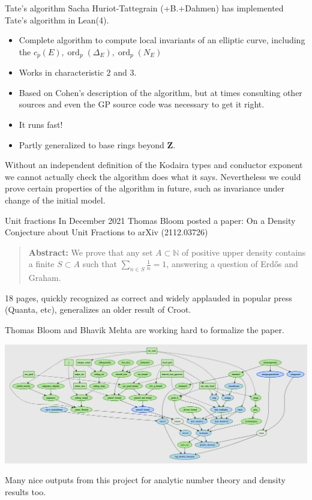 \documentclass{beamer}
\theoremstyle{plain}
\newcommand{\ZZ}{\mathbf{Z}}
\DeclareMathOperator{\ord}{ord}
\begin{document}
\begin{frame}{Tate's algorithm}
    Sacha Huriot-Tattegrain (+B.+Dahmen) has implemented Tate's algorithm in Lean(4).

    \begin{itemize}
        \item Complete algorithm to compute local invariants of an elliptic curve, including the $c_p(E), \ord_p(\Delta_E), \ord_p(N_E)$

        \item Works in characteristic 2 and 3.

        \item Based on Cohen's description of the algorithm, but at times consulting other sources and even the GP source code was necessary to get it right.

        \item It runs fast!

        \item Partly generalized to base rings beyond $\ZZ$.
    \end{itemize}

    Without an independent definition of the Kodaira types and conductor exponent we cannot actually check the algorithm does what it says.
    Nevertheless we could prove certain properties of the algorithm in future, such as invariance under change of the initial model.
\end{frame}


\begin{frame}{Unit fractions}
    In December 2021 Thomas Bloom posted a paper: On a Density Conjecture about Unit Fractions to arXiv (2112.03726)
    \begin{quote}
        \textbf{Abstract:} We prove that any set $A \subset \mathbb{N}$ of positive upper density contains a finite $S \subset A$ such that $\sum_{n \in S} \frac{1}{n}=1$, answering a question of Erdős and Graham.
    \end{quote}
    18 pages, quickly recognized as correct and widely applauded in popular press (Quanta, etc), generalizes an older result of Croot.

    Thomas Bloom and Bhavik Mehta are working hard to formalize the paper.
\end{frame}

\begin{frame}
    \includegraphics[width=1.1\linewidth]{unit.png}

    Many nice outputs from this project for analytic number theory and density results too.
\end{frame}
\end{document}
